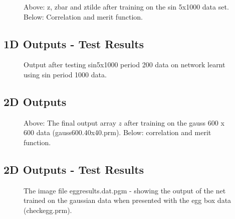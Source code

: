 \documentclass[a4paper]{article}
\begin{document}
\begin{figure}[h!]
\centerline{}
\centerline{}
\caption{Above: z, zbar and ztilde after training on the sin 5x1000
  data set. Below: Correlation and merit function.}
\label{sintrain.p}
\end{figure}

\clearpage

\subsection*{1D Outputs - Test Results}
\begin{figure}[h!]
  \centerline{}
\caption{Output after testing sin5x1000 period 200 data on network
  learnt using sin period 1000 data.}
\label{sintest.p}
\end{figure}

\clearpage



\subsection{2D Outputs}


\begin{figure}[h!]
  \centerline{}
  \vspace{0.3cm}
  \centerline{}
  \caption{Above: The final output array $z$ after training on the gauss 600 x
    600 data (gauss600.40x40.prm).  Below: correlation and merit function.}
  \label{gausstrain.p}
\end{figure}

\clearpage

\subsection*{2D Outputs - Test Results}

\begin{figure}[h!]
\centerline{}
\caption{The image file eggresults.dat.pgm - showing the output of the net
  trained on the gaussian data when presented with the egg box data (checkegg.prm).}

\label{gausstest.p}
\end{figure}
\end{document}
